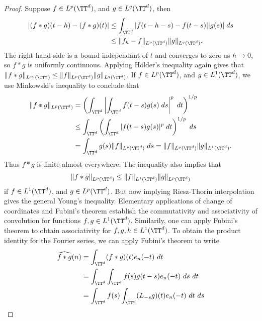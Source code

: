 \begin{proof}
    Suppose $f \in L^p(\TT^d)$, and $g \in L^q(\TT^d)$, then
    \begin{align*}
        |(f * g)(t - h) - (f * g)(t)| &\leq \int_{\TT^d} |f(t-h-s) - f(t-s)| |g(s)|\; ds\\
        &\leq \| f_h - f \|_{L^p(\TT^d)} \| g \|_{L^q(\TT^d)}.
    \end{align*}
    The right hand side is a bound independant of $t$ and converges to zero as $h \to 0$, so $f * g$ is uniformly continuous. Applying H\"{o}lder's inequality again gives that $\| f * g \|_{L^\infty(\TT^d)} \leq \| f \|_{L^p(\TT^d)} \| g \|_{L^q(\TT^d)}$. If $f \in L^p(\TT^d)$, and $g \in L^1(\TT^d)$, we use Minkowski's inequality to conclude that
    \begin{align*}
        \| f * g \|_{L^p(\TT^d)} &= \left( \int_{\TT^d} \left| \int_{\TT^d} f(t-s)g(s)\; ds \right|^p\; dt \right)^{1/p}\\
        &\leq \int_{\TT^d} \left( \int_{\TT^d} |f(t-s)g(s)|^p\; dt \right)^{1/p}\; ds\\
        &= \int_{\TT^d} g(s) \| f \|_{L^p(\TT^d)}\; ds = \| f \|_{L^p(\TT^d)} \| g \|_{L^1(\TT^d)}.
    \end{align*}
    Thus $f * g$ is finite almost everywhere. The inequality also implies that
    \[ \| f * g \|_{L^p(\TT^d)} \leq \| f \|_{L^1(\TT^d)} \| g \|_{L^p(\TT^d)} \]
    if $f \in L^1(\TT^d)$, and $g \in L^p(\TT^d)$. But now implying Riesz-Thorin interpolation gives the general Young's inequality. Elementary applications of change of coordinates and Fubini's theorem establish the commutativity and associativity of convolution for functions $f, g \in L^1(\TT^d)$.
    Similarily, one can apply Fubini's theorem to obtain associativity for $f,g,h \in L^1(\TT^d)$. To obtain the product identity for the Fourier series, we can apply Fubini's theorem to write
    \begin{align*}
        \widehat{f * g}(n) &= \int_{\TT^d} (f * g)(t) e_n(-t)\ dt\\
        &= \int_{\TT^d} \int_{\TT^d} f(s)g(t-s) e_n(-t)\ ds\ dt\\
        &= \int_{\TT^d} f(s) \int_{\TT^d} (L_{-s}g)(t) e_n(-t)\ dt\ ds\\

\end{align*}
\end{proof}
